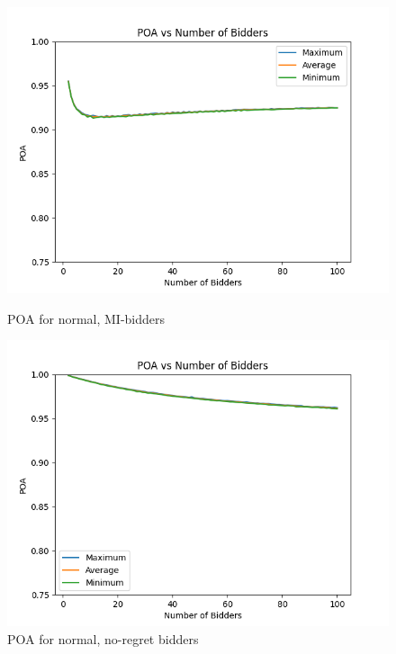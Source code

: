 \documentclass[12pt,twoside]{reedthesis}
\begin{document}
\begin{figure}
	\centering
	\begin{minipage}{0.49\textwidth}
		\centering
		\includegraphics[scale=0.5]{Figures/zi_normal}
		\caption{POA for normal, MI-bidders}
		\label{figure:mi_noraml}
	\end{minipage}
	\begin{minipage}{0.49\textwidth}
		\centering
		\includegraphics[scale=0.5]{Figures/symmetric_normal}
		\caption{POA for normal, no-regret bidders}
		\label{figure:normal}
	\end{minipage}
\end{figure}
\end{document}
